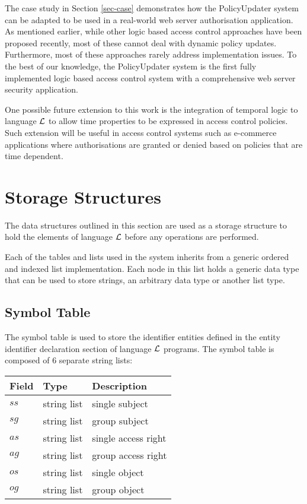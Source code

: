 \documentclass[global,twocolumn,final]{svjour}
\makeatletter
\newenvironment{vquote}
  {\begin{list}{}{\leftmargin 1em}\item[]}
  {\end{list}}
\newcommand{\vappsection}[1]{
  \renewcommand{\@seccntformat}[1]{
    \appendixname\hspace{0.5em}\csname the##1\endcsname \hspace{1em}
  }
  \section{#1}
  \renewcommand{\@seccntformat}[1]{
    \csname the##1\endcsname\hspace{1em}
  }
}
\makeatother
\begin{document}
    The case study in Section \ref{sec-case} demonstrates how the PolicyUpdater
    system can be adapted to be used in a real-world web server authorisation
    application. As mentioned earlier, while other logic based access control
    approaches have been proposed recently, most of these cannot deal with
    dynamic policy updates. Furthermore, most of these approaches rarely
    address implementation issues. To the best of our knowledge, the
    PolicyUpdater system is the first fully implemented logic based access
    control system with a comprehensive web server security application.

    One possible future extension to this work is the integration of temporal
    logic to language ${\cal L}$ to allow time properties to be expressed in
    access control policies. Such extension will be useful in access control
    systems such as e-commerce applications where authorisations are granted
    or denied based on policies that are time dependent.

  \appendix

  \vappsection{Storage Structures}

    \label{app-store}

    The data structures outlined in this section are used as a storage
    structure to hold the elements of language ${\cal L}$ before any
    operations are performed.

    Each of the tables and lists used in the system inherits from a generic
    ordered and indexed list implementation. Each node in this list holds a
    generic data type that can be used to store strings, an arbitrary data
    type or another list type.

    \subsection{Symbol Table}

      The symbol table is used to store the identifier entities defined in
      the entity identifier declaration section of language ${\cal L}$
      programs. The symbol table is composed of 6 separate string lists:

      \begin{vquote}
        \begin{tabular}[t]{|l|l|l|}
          \hline
          \textbf{Field} & \textbf{Type} & \textbf{Description} \\
          \hline
          $ss$ & string list & single subject \\
          \hline
          $sg$ & string list & group subject \\
          \hline
          $as$ & string list & single access right \\
          \hline
          $ag$ & string list & group access right \\
          \hline
          $os$ & string list & single object \\
          \hline
          $og$ & string list & group object \\
          \hline
        \end{tabular}
      \end{vquote}
\end{document}
